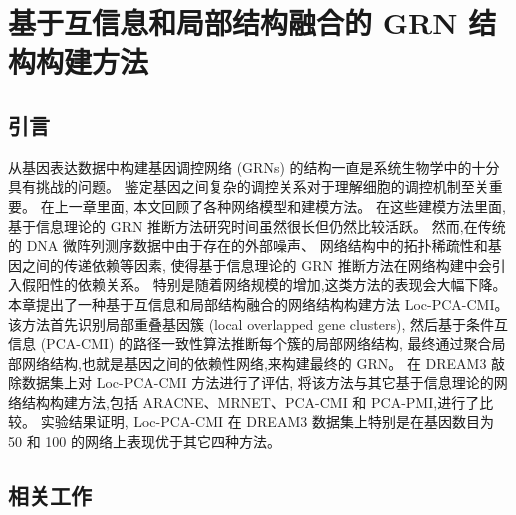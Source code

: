 \section{基于互信息和局部结构融合的 GRN 结构构建方法}
\label{sec:locpcacmi}

\subsection{引言}

从基因表达数据中构建基因调控网络 (GRNs) 的结构一直是系统生物学中的十分具有挑战的问题。
鉴定基因之间复杂的调控关系对于理解细胞的调控机制至关重要。
在上一章里面, 本文回顾了各种网络模型和建模方法。
在这些建模方法里面,
基于信息理论的 GRN 推断方法研究时间虽然很长但仍然比较活跃。
然而,在传统的 DNA 微阵列测序数据中由于存在的外部噪声、
网络结构中的拓扑稀疏性和基因之间的传递依赖等因素,
使得基于信息理论的 GRN 推断方法在网络构建中会引入假阳性的依赖关系。
特别是随着网络规模的增加,这类方法的表现会大幅下降。
本章提出了一种基于互信息和局部结构融合的网络结构构建方法 Loc-PCA-CMI。
该方法首先识别局部重叠基因簇 (local overlapped gene clusters),
然后基于条件互信息 (PCA-CMI) 的路径一致性算法推断每个簇的局部网络结构,
最终通过聚合局部网络结构,也就是基因之间的依赖性网络,来构建最终的 GRN。
在 DREAM3 敲除数据集上对 Loc-PCA-CMI 方法进行了评估,
将该方法与其它基于信息理论的网络结构构建方法,包括 ARACNE、MRNET、PCA-CMI 和 PCA-PMI,进行了比较。
实验结果证明, Loc-PCA-CMI 在 DREAM3 数据集上特别是在基因数目为 50 和 100 的网络上表现优于其它四种方法。

\subsection{相关工作}
\label{subsec:relatedwork}



